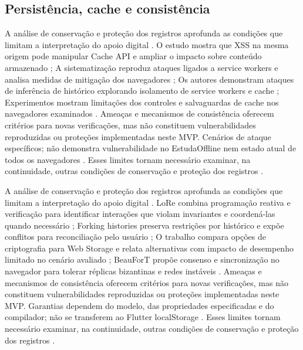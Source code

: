 \clearpage\subsection*{Persistência, cache e consistência}

A análise de conservação e proteção dos registros aprofunda as condições que limitam a interpretação do apoio digital \citep{OS01} \citep{OS02} \citep{OS03} \citep{OS06}. O estudo mostra que XSS na mesma origem pode manipular Cache API e ampliar o impacto sobre conteúdo armazenado \citep{OS01}; A sistematização reproduz ataques ligados a service workers e analisa medidas de mitigação dos navegadores \citep{OS02}; Os autores demonstram ataques de inferência de histórico explorando isolamento de service workers e cache \citep{OS03}; Experimentos mostram limitações dos controles e salvaguardas de cache nos navegadores examinados \citep{OS06}. Ameaças e mecanismos de consistência oferecem critérios para novas verificações, mas não constituem vulnerabilidades reproduzidas ou proteções implementadas neste MVP. Cenários de ataque específicos; não demonstra vulnerabilidade no EstudaOffline nem estado atual de todos os navegadores \citep{OS01} \citep{OS02} \citep{OS03} \citep{OS06}. Esses limites tornam necessário examinar, na continuidade, outras condições de conservação e proteção dos registros \citep{OS01} \citep{OS02} \citep{OS03} \citep{OS06}.

A análise de conservação e proteção dos registros aprofunda as condições que limitam a interpretação do apoio digital \citep{OS07} \citep{OS08} \citep{OS09} \citep{OS10}. LoRe combina programação reativa e verificação para identificar interações que violam invariantes e coordená-las quando necessário \citep{OS07}; Forking histories preserva restrições por histórico e expõe conflitos para reconciliação pelo usuário \citep{OS08}; O trabalho compara opções de criptografia para Web Storage e relata alternativas com impacto de desempenho limitado no cenário avaliado \citep{OS09}; BeauForT propõe consenso e sincronização no navegador para tolerar réplicas bizantinas e redes instáveis \citep{OS10}. Ameaças e mecanismos de consistência oferecem critérios para novas verificações, mas não constituem vulnerabilidades reproduzidas ou proteções implementadas neste MVP. Garantias dependem do modelo, das propriedades especificadas e do compilador; não se transferem ao Flutter localStorage \citep{OS07} \citep{OS08} \citep{OS09} \citep{OS10}. Esses limites tornam necessário examinar, na continuidade, outras condições de conservação e proteção dos registros \citep{OS07} \citep{OS08} \citep{OS09} \citep{OS10}.

